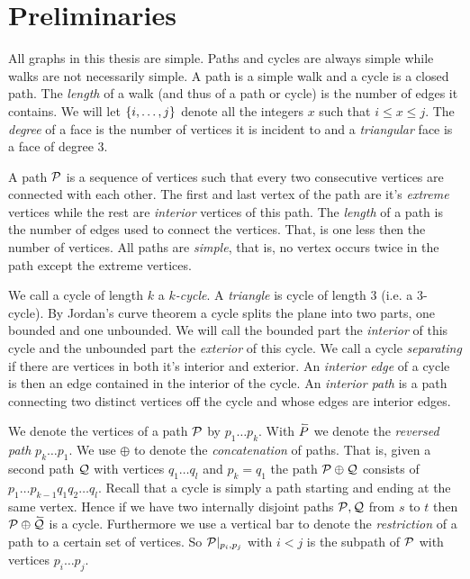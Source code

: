 
\section{Preliminaries}
All graphs in this thesis are simple. Paths and cycles are always simple while walks are not necessarily simple. A path is a simple walk and a cycle is a closed path.
The \emph{length} of a walk (and thus of a path or cycle) is the number of edges it contains.
We will let $\braces {i, \ldots, j}$ denote all the integers $x$ such that $i \leq x \leq j$.
The \emph{degree} of a face is the number of vertices it is incident to and a \emph{triangular} face is a face of degree $3$.

  A path $\P$ is a sequence of vertices such that every two consecutive vertices are connected with each other. The first and last vertex of the path are it's \emph{extreme} vertices while the rest are \emph{interior} vertices of this path. The \emph{length} of a path is the number of edges used to connect the vertices. That, is one less then the number of vertices. All paths are \emph{simple}, that is, no vertex occurs twice in the path except the extreme vertices.

  We call a cycle of length $k$  a \emph{$k$-cycle}. A \emph{triangle} is cycle of length $3$ (i.e. a $3$-cycle).
  By Jordan's curve theorem a cycle splits the plane into two parts, one bounded and one unbounded. We will call the bounded part the \emph{interior} of this cycle and the unbounded part the \emph{exterior} of this cycle.
  We call a cycle \emph{separating} if there are vertices in both it's interior and exterior.
  An \emph{interior edge} of a cycle is then an edge contained in the interior of the cycle.
  An \emph{interior path} is a path connecting two distinct vertices off the cycle and whose edges are interior edges.

  We denote the vertices of a path $\P$ by $p_1 \ldots p_k$.
  With $\rev{P}$ we denote the \emph{reversed path} $p_k \ldots p_1$. We use $\oplus$ to denote the \emph{concatenation} of paths. That is, given a second path $\Q$ with vertices $q_1 \ldots q_l$ and $p_k = q_1$ the path $\P \oplus \Q$ consists of $p_1 \ldots p_{k-1} q_1 q_2 \ldots q_l$.
  Recall that a cycle is simply a path starting and ending at the same vertex. Hence if we have two  internally disjoint paths $\P, \Q$ from $s$ to $t$ then $\P \oplus \rev{\Q}$ is a cycle.
  Furthermore we use a vertical bar to denote the \emph{restriction} of a path to a certain set of vertices. So $\P|_{p_i, p_j}$ with $i<j$ is the subpath of $\P$ with vertices $p_i \ldots p_j$.

